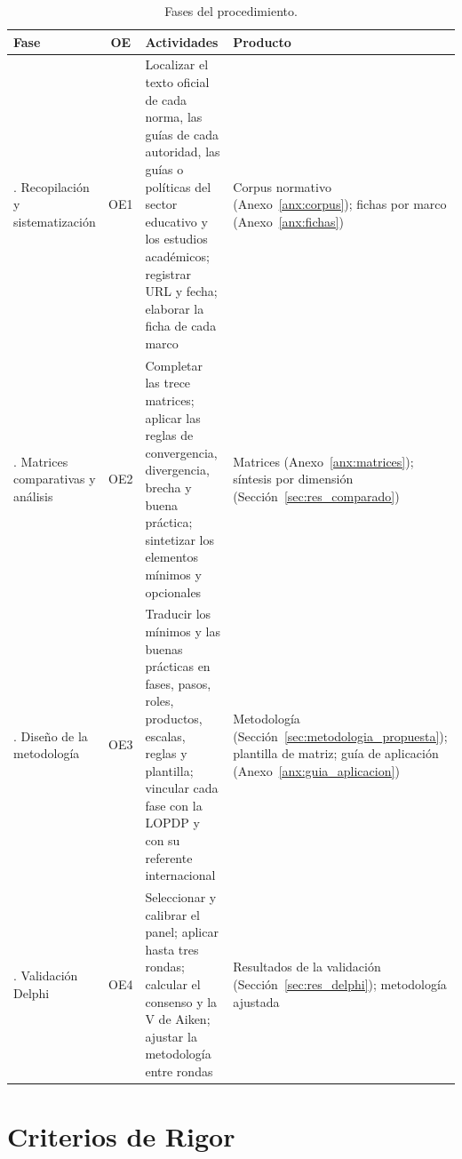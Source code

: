 \begin{table}[htbp]
  \centering
  \caption{Fases del procedimiento.}
  \label{tab:procedimiento}
  \scriptsize
  \renewcommand{\arraystretch}{1.15}
  \begin{tabularx}{\textwidth}{|>{\raggedright\arraybackslash}p{2.4cm}|c|L|>{\raggedright\arraybackslash}p{3.4cm}|}
    \hline
    \textbf{Fase} & \textbf{OE} & \textbf{Actividades} & \textbf{Producto} \\
    . Recopilación y sistematización & OE1 & Localizar el texto oficial de cada norma, las guías de cada autoridad, las guías o políticas del sector educativo y los estudios académicos; registrar URL y fecha; elaborar la ficha de cada marco & Corpus normativo (Anexo~\ref{anx:corpus}); fichas por marco (Anexo~\ref{anx:fichas}) \\ . Matrices comparativas y análisis & OE2 & Completar las trece matrices; aplicar las reglas de convergencia, divergencia, brecha y buena práctica; sintetizar los elementos mínimos y opcionales & Matrices (Anexo~\ref{anx:matrices}); síntesis por dimensión (Sección~\ref{sec:res_comparado}) \\ . Diseño de la metodología & OE3 & Traducir los mínimos y las buenas prácticas en fases, pasos, roles, productos, escalas, reglas y plantilla; vincular cada fase con la LOPDP y con su referente internacional & Metodología (Sección~\ref{sec:metodologia_propuesta}); plantilla de matriz; guía de aplicación (Anexo~\ref{anx:guia_aplicacion}) \\ . Validación Delphi & OE4 & Seleccionar y calibrar el panel; aplicar hasta tres rondas; calcular el consenso y la V de Aiken; ajustar la metodología entre rondas & Resultados de la validación (Sección~\ref{sec:res_delphi}); metodología ajustada \\ \hline
  \end{tabularx}
  \raggedright
\end{table}

\section{Criterios de Rigor}
\label{sec:rigor}

